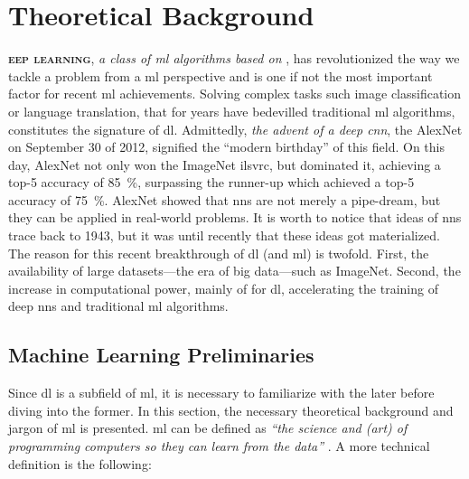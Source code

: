 \chapter{Theoretical Background}

\lettrine[
	nindent=0em, findent=0.5em, loversize=-0.12, lines=5
]{}{\bfseries\color{Blue}eep learning},
\emph{a class of \acrlong{ml} algorithms based on
}, has revolutionized the way we tackle a problem from a \gls{ml}
perspective and is one if not the most important factor for recent \gls{ml}
achievements. Solving complex tasks such image classification or language translation, that for
years have bedevilled traditional \gls{ml} algorithms, constitutes the signature
of \gls{dl}. Admittedly, \emph{the advent of a deep
\acrlong{cnn}}, the AlexNet \parencite{alexnet}
on September 30 of 2012, signified the ``modern birthday'' of this field. On
this day, AlexNet not only won the ImageNet \parencite{Deng_2009}
\gls{ilsvrc}, but dominated it, achieving a top-5 accuracy
of \SI{85}{\percent}, surpassing the runner-up which achieved a top-5 accuracy
of \SI{75}{\percent}.  AlexNet showed that \glspl{nn} are not merely a
pipe-dream, but they can be applied in real-world problems. It is worth to
notice that ideas of \glspl{nn} trace back to 1943, but it was until recently
that these ideas got materialized. The reason for this recent breakthrough of
\gls{dl} (and \gls{ml}) is twofold. First, the availability of large
datasets---the era of big data---such as
ImageNet. Second, the increase in computational power, mainly of
 for \gls{dl}, accelerating the training of deep \glspl{nn} and
traditional \gls{ml} algorithms.

\section{Machine Learning Preliminaries}

Since \gls{dl} is a subfield of \gls{ml}, it is necessary to familiarize with
the later before diving into the former. In this section, the necessary
theoretical background and jargon of \gls{ml} is presented. \Acrlong{ml} can be
defined as \emph{``the science and (art) of programming computers so they can
learn from the data''} \parencite{ml}. A more technical definition is the following:


